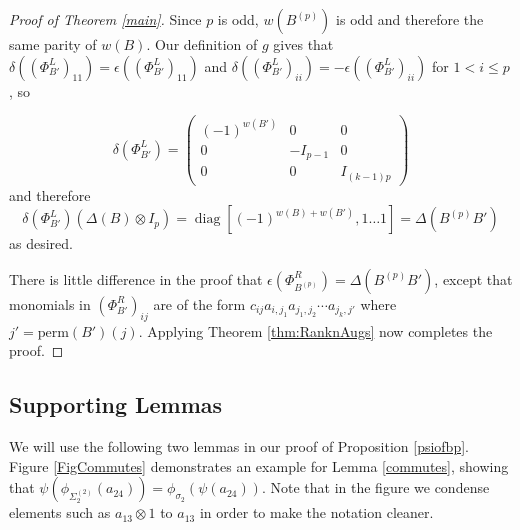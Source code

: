 \documentclass{amsart}[11pt,fullpage]
\def\s{{\sigma}}
\newcommand\diag{\operatorname{diag}}
\theoremstyle{definition}
\begin{document}
\begin{proof}[Proof of Theorem \ref{main}]
Since $p$ is odd, $w(B^{(p)})$ is odd and therefore the same parity of $w(B)$. Our definition of $g$ gives that $\delta\left(\left(\Phi_{B'}^L\right)_{11}\right) = \epsilon\left(\left(\Phi_{B'}^L\right)_{11}\right)$ and $\delta\left(\left(\Phi_{B'}^L\right)_{ii}\right) = -\epsilon\left(\left(\Phi_{B'}^L\right)_{ii}\right)$ for $1<i\le p$, so 

$$\delta\left(\Phi_{B'}^L\right) = 
\left( \begin{array}{ccc}
(-1)^{w(B')} & 0 & 0 \\
0 & -I_{p-1} & 0 \\
0 & 0 & I_{(k-1)p} \end{array} \right)
$$
\noindent and therefore
$$
\delta\left(\Phi_{B'}^L\right)\left(\Delta(B)\otimes I_p\right)= \diag[(-1)^{w(B) + w(B')},1\ldots 1] = \Delta(B^{(p)}B')
$$
\noindent as desired. 

There is little difference in the proof that $\epsilon(\Phi_{B^{(p)}}^R) = \Delta(B^{(p)}B')$, except that monomials in $(\Phi_{B'}^R)_{ij}$ are of the form $c_{ij}a_{i,j_1}a_{j_1,j_2}\cdots a_{j_k,j'}$ where $j'=\text{perm}(B')(j)$. Applying Theorem \ref{thm:RanknAugs} now completes the proof.
\end{proof}

\subsection{Supporting Lemmas}
\label{SecLemmasMain}

\noindent We will use the following two lemmas in our proof of Proposition \ref{psiofbp}. Figure \ref{FigCommutes} demonstrates an example for Lemma \ref{commutes}, showing that $\psi(\phi_{\Sigma^{(2)}_2}(a_{24})) = \phi_{\s_2}(\psi(a_{24}))$. Note that in the figure we condense elements such as $a_{13}\otimes 1$ to $a_{13}$ in order to make the notation cleaner.
\end{document}
